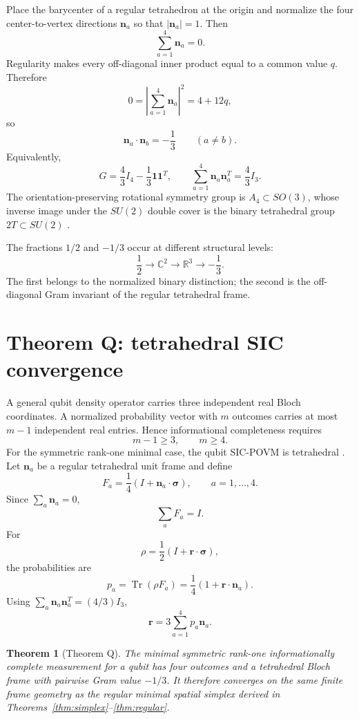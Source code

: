 \documentclass[12pt,a4paper]{article}
\newtheorem{theorem}{Theorem}[section]
\newcommand{\Tr}{\operatorname{Tr}}
\newcommand{\R}{\mathbb{R}}
\newcommand{\C}{\mathbb{C}}
\newcommand{\sigmavec}{\bm{\sigma}}
\newcommand{\rvec}{\bm{r}}
\newcommand{\nvec}{\bm{n}}
\begin{document}
Place the barycenter of a regular tetrahedron at the origin and normalize the four center-to-vertex directions $\nvec_a$ so that $|\nvec_a|=1$. Then
\[
\boxed{\sum_{a=1}^{4}\nvec_a=0.}
\]
Regularity makes every off-diagonal inner product equal to a common value $q$. Therefore
\[
0=\left|\sum_{a=1}^{4}\nvec_a\right|^2=4+12q,
\]
so
\[
\boxed{
\nvec_a\cdot\nvec_b=-\frac13\qquad(a\ne b).
}
\]
Equivalently,
\[
\boxed{
G=\frac43I_4-\frac13\mathbf1\mathbf1^T,
\qquad
\sum_{a=1}^{4}\nvec_a\nvec_a^T=\frac43I_3.
}
\]
The orientation-preserving rotational symmetry group is $A_4\subset SO(3)$, whose inverse image under the $SU(2)$ double cover is the binary tetrahedral group $2T\subset SU(2)$ \cite{Coxeter}.

The fractions $1/2$ and $-1/3$ occur at different structural levels:
\[
\boxed{
\frac12\longrightarrow\C^2\longrightarrow\R^3\longrightarrow-\frac13.
}
\]
The first belongs to the normalized binary distinction; the second is the off-diagonal Gram invariant of the regular tetrahedral frame.

\section{Theorem Q: tetrahedral SIC convergence}

A general qubit density operator carries three independent real Bloch coordinates. A normalized probability vector with $m$ outcomes carries at most $m-1$ independent real entries. Hence informational completeness requires
\[
m-1\ge3,
\qquad
\boxed{m\ge4.}
\]
For the symmetric rank-one minimal case, the qubit SIC-POVM is tetrahedral \cite{RenesEtAl}. Let $\nvec_a$ be a regular tetrahedral unit frame and define
\[
\boxed{
F_a=\frac14\left(I+\nvec_a\cdot\sigmavec\right),
\qquad a=1,\ldots,4.
}
\]
Since $\sum_a\nvec_a=0$,
\[
\sum_aF_a=I.
\]
For
\[
\rho=\frac12\left(I+\rvec\cdot\sigmavec\right),
\]
the probabilities are
\[
\boxed{
p_a=\Tr(\rho F_a)=\frac14\left(1+\rvec\cdot\nvec_a\right).}
\]
Using $\sum_a\nvec_a\nvec_a^T=(4/3)I_3$,
\[
\boxed{\rvec=3\sum_{a=1}^{4}p_a\nvec_a.}
\]

\begin{theorem}[Theorem Q]
The minimal symmetric rank-one informationally complete measurement for a qubit has four outcomes and a tetrahedral Bloch frame with pairwise Gram value $-1/3$. It therefore converges on the same finite frame geometry as the regular minimal spatial simplex derived in Theorems~\ref{thm:simplex}--\ref{thm:regular}.
\end{theorem}
\end{document}
